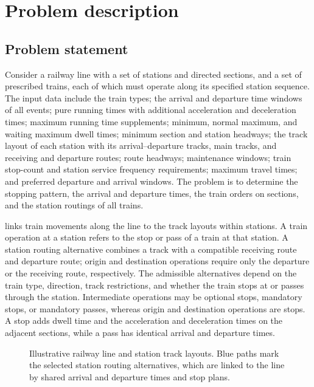 \section{Problem description}\label{sec:problem}
\subsection{Problem statement}
Consider a railway line with a set of stations and directed sections, and a set of prescribed trains, each of which must operate along its specified station sequence. The input data include the train types; the arrival and departure time windows of all events; pure running times with additional acceleration and deceleration times; maximum running time supplements; minimum, normal maximum, and waiting maximum dwell times; minimum section and station headways; the track layout of each station with its arrival--departure tracks, main tracks, and receiving and departure routes; route headways; maintenance windows; train stop-count and station service frequency requirements; maximum travel times; and preferred departure and arrival windows. The problem is to determine the stopping pattern, the arrival and departure times, the train orders on sections, and the station routings of all trains.

 links train movements along the line to the track layouts within stations. A train operation at a station refers to the stop or pass of a train at that station. A station routing alternative combines a track with a compatible receiving route and departure route; origin and destination operations require only the departure or the receiving route, respectively. The admissible alternatives depend on the train type, direction, track restrictions, and whether the train stops at or passes through the station. Intermediate operations may be optional stops, mandatory stops, or mandatory passes, whereas origin and destination operations are stops. A stop adds dwell time and the acceleration and deceleration times on the adjacent sections, while a pass has identical arrival and departure times.

\begin{figure}[tb]
\centering
\resizebox{\textwidth}{!}{}
\caption{Illustrative railway line and station track layouts. Blue paths mark the selected station routing alternatives, which are linked to the line by shared arrival and departure times and stop plans.}\label{fig:network}
\end{figure}

